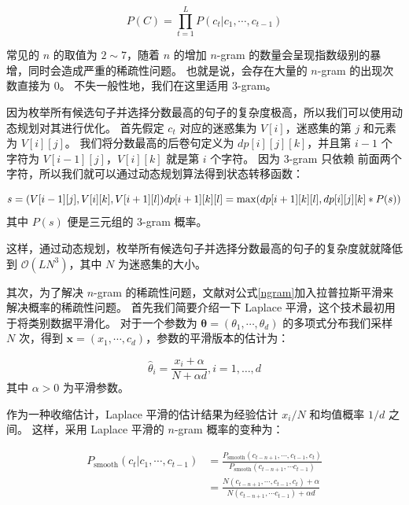 \begin{equation}
	P(C) = \prod_{t=1}^L P(c_t | c_1, \cdots, c_{t-1})
\end{equation}

常见的 $n$ 的取值为 $2 \sim 7$，随着 $n$ 的增加 $n$-gram 的数量会呈现指数级别的暴增，同时会造成严重的稀疏性问题。
也就是说，会存在大量的 $n$-gram 的出现次数直接为 $0$。
不失一般性地，我们在这里适用 $3$-gram。

因为枚举所有候选句子并选择分数最高的句子的复杂度极高，所以我们可以使用动态规划对其进行优化。
首先假定 $c_t$ 对应的迷惑集为 $V[i]$，迷惑集的第 $j$ 和元素为 $V[i][j]$。
我们将分数最高的后卷句定义为 $dp[i][j][k]$，并且第 $i-1$ 个字符为 $V[i-1][j]$，$V[i][k]$ 就是第 $i$ 个字符。
因为 $3$-gram 只依赖 前面两个字符，所以我们就可以通过动态规划算法得到状态转移函数：

\begin{equation}
	s = (V[i-1][j], V[i][k], V[i+1][l]) \\
	dp[i+1][k][l] = \max(dp[i+1][k][l], dp[i][j][k] * P(s))
\end{equation}
其中 $P(s)$ 便是三元组的 $3$-gram 概率。

这样，通过动态规划，枚举所有候选句子并选择分数最高的句子的复杂度就就降低到 $\mathcal{O}(LN^3)$，其中 $N$ 为迷惑集的大小。

其次，为了解决 $n$-gram 的稀疏性问题，文献\cite{huang2014chinese}对公式\ref{ngram}加入拉普拉斯平滑来解决概率的稀疏性问题。
首先我们简要介绍一下 Laplace 平滑，这个技术最初用于将类别数据平滑化。
对于一个参数为 $\bm{\theta} = (\theta_1, \cdots, \theta_d)$ 的多项式分布我们采样 $N$ 次，得到 $\bm{x} = (x_1, \cdots, c_d)$，参数的平滑版本的估计为：

\begin{equation}
	\hat{\theta}_i = \frac{x_i + \alpha}{N + \alpha d}, i=1,\dots,d
\end{equation}
其中 $\alpha > 0$ 为平滑参数。

作为一种收缩估计，Laplace 平滑的估计结果为经验估计 $x_i / N$ 和均值概率 $1/d$ 之间。
这样，采用 Laplace 平滑的 $n$-gram 概率的变种为：

\begin{align}
	P_{\text{smooth}}(c_t | c_1, \cdots, c_{t-1}) &= \frac{P_{\text{smooth}}(c_{t-n+1}, \cdots, c_{t-1}, c_t)}{P_{\text{smooth}}(c_{t-n+1}, \cdots c_{t-1})} \nonumber \\
	&= \frac{N(c_{t-n+1}, \cdots, c_{t-1}, c_t) + \alpha}{N(c_{t-n+1}, \cdots c_{t-1}) + \alpha d}
\end{align}

